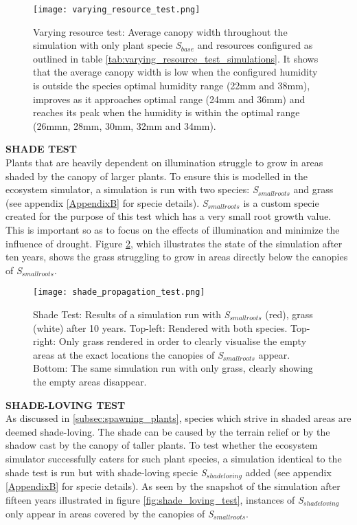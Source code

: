 \begin{figure}
\center
	\texttt{[image: varying\_resource\_test.png]}
	\caption{ Varying resource test: Average canopy width throughout the simulation with only plant specie \textit{S$_{base}$} and resources configured as outlined in table \ref{tab:varying_resource_test_simulations}. It shows that the average canopy width is low when the configured humidity is outside the species optimal humidity range (22mm and 38mm), improves as it approaches optimal range (24mm and 36mm) and reaches its peak when the humidity is within the optimal range (26mmn, 28mm, 30mm, 32mm and 34mm).}
	\label{fig:varying_resource_test}
\end{figure}

\textbf{SHADE TEST}\\

Plants that are heavily dependent on illumination struggle to grow in areas shaded by the canopy of larger plants. To ensure this is modelled in the ecosystem simulator, a simulation is run with two species: \textit{S$_{smallroots}$} and grass (see appendix \ref{AppendixB} for specie details). \textit{S$_{smallroots}$} is a custom specie created for the purpose of this test which has a very small root growth value. This is important so as to focus on the effects of illumination and minimize the influence of drought. Figure \ref{fig:shade_test}, which illustrates the state of the simulation after ten years, shows the grass struggling to grow in areas directly below the canopies of \textit{S$_{smallroots}$}.\\

\begin{figure}
\center
	\texttt{[image: shade\_propagation\_test.png]}
	\caption{ Shade Test: Results of a simulation run with \textit{S$_{smallroots}$} (red), grass (white) after 10 years. Top-left: Rendered with both species. Top-right: Only grass rendered in order to clearly visualise the empty areas at the exact locations the canopies of \textit{S$_{smallroots}$} appear. Bottom: The same simulation run with only grass, clearly showing the empty areas disappear.} 
	\label{fig:shade_test}
\end{figure}

\textbf{SHADE-LOVING TEST}\\

As discussed in \ref{subsec:spawning_plants}, species which strive in shaded areas are deemed shade-loving. The shade can be caused by the terrain relief or by the shadow cast by the canopy of taller plants. To test whether the ecosystem simulator successfully caters for such plant species, a simulation identical to the shade test is run but with shade-loving specie \textit{S$_{shadeloving}$} added (see appendix \ref{AppendixB} for specie details). As seen by the snapshot of the simulation after fifteen years illustrated in figure \ref{fig:shade_loving_test}, instances of \textit{S$_{shadeloving}$} only appear in areas covered by the canopies of \textit{S$_{smallroots}$}.

